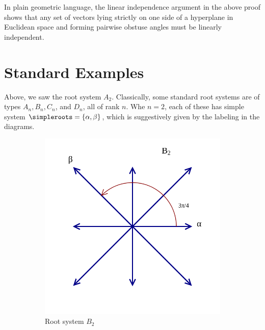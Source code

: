 \documentclass[11pt,leqno,oneside]{amsart}
\numberwithin{thm}{section}
\begin{document}
\begin{rmk}
  In plain geometric language, the linear independence argument in the
  above proof shows that any set of
  vectors lying strictly on one 
  side of a hyperplane in Euclidean space and forming pairwise obstuse
  angles must be linearly independent.
\end{rmk}
\section{Standard Examples}
Above, we saw the root system \(A_2\). Classically, some standard
 root systems are of types \(A_n, B_n, C_n\), and
\(D_n\), all of rank \(n\). Whe \(n=2\), each of these has simple system \(\simpleroots =
\{\alpha,\beta\}\), which is suggestively given by the labeling in the diagrams.
\begin{figure}
  \begin{subfigure}{.3\textwidth}
    \centering
    \includegraphics[width=\textwidth]{images/Root_system_B2_with_labels.png}
    \caption{Root system $B_2$}
  \end{subfigure}
  \begin{subfigure}{.3\textwidth}
    \centering

\end{subfigure}
\end{figure}
\end{document}
